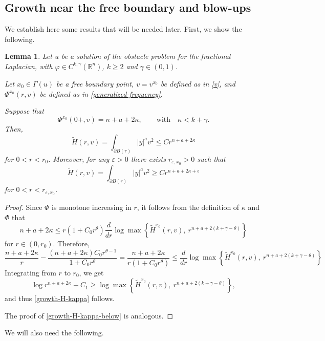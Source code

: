 \documentclass[11pt]{amsart}
\theoremstyle{plain}
\newtheorem{lemma}[thrm]{Lemma}
\numberwithin{equation}{section}
\begin{document}
\subsection{Growth near the free boundary and blow-ups}

We establish here some results that will be needed later.
First, we show the following.

\begin{lemma}\label{bound-H}
Let $u$ be a solution of the obstacle problem for the fractional Laplacian, with $\varphi\in C^{k,\gamma}({\mathbb R}^n)$,  $k\geq2$ and $\gamma\in(0,1)$.

Let $x_0\in \Gamma(u)$ be a free boundary point, $v=v^{x_0}$ be defined as in \eqref{v}, and $\Phi^{x_0}(r,v)$ be defined as in \eqref{generalized-frequency}.

Suppose that
\[\Phi^{x_0}(0+,v)=n+a+2\kappa,\qquad \textrm{with}\quad \kappa<k+\gamma.\]
Then,
\begin{equation}\label{growth-H-kappa}
\tilde H(r,v)=\int_{\partial {B(r)}}{|y|^{a}v^2 }\leq Cr^{n+a+2\kappa}
\end{equation}
for $0<r<r_0$.
Moreover, for any $\varepsilon>0$ there exists $r_{\varepsilon,x_0}>0$ such that
\begin{equation}\label{growth-H-kappa-below}
\tilde H(r,v)=\int_{\partial {B(r)}}{|y|^{a}v^2 }\geq Cr^{n+a+2\kappa+\epsilon}
\end{equation}
for $0<r<r_{\varepsilon,x_0}$.
\end{lemma}

\begin{proof}
Since $\Phi$ is monotone increasing in $r$, it follows from the definition of $\kappa$ and $\Phi$ that
\[n+a+2\kappa\leq r(1+C_0r^\theta)\frac{d}{dr}\log\max\left\{\tilde{H}^{x_0}(r,v),\ r^{n+a+2(k+\gamma-\theta)}\right\}\]
for $r\in(0,r_0)$.
Therefore,
\[\frac{n+a+2\kappa}{r}-\frac{(n+a+2\kappa)C_0r^{\theta-1}}{1+C_0r^\theta}=\frac{n+a+2\kappa}{r(1+C_0r^\theta)}\leq \frac{d}{dr}\log\max\left\{\tilde{H}^{x_0}(r,v),\ r^{n+a+2(k+\gamma-\theta)}\right\}\]
Integrating from $r$ to $r_0$, we get
\[\log r^{n+a+2\kappa}+C_1\geq \log\max\left\{\tilde{H}^{x_0}(r,v),\ r^{n+a+2(k+\gamma-\theta)}\right\},\]
and thus \eqref{growth-H-kappa} follows.

The proof of \eqref{growth-H-kappa-below} is analogous.
\end{proof}

We will also need the following.
\end{document}
